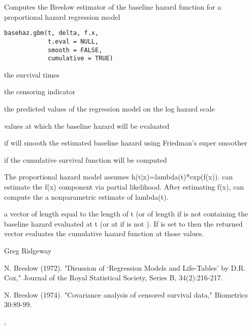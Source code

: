 \begin{Description}\relax
Computes the Breslow estimator of the baseline hazard function for a proportional hazard regression model
\end{Description}
\begin{Usage}
\begin{verbatim}
basehaz.gbm(t, delta, f.x, 
            t.eval = NULL, 
            smooth = FALSE, 
            cumulative = TRUE)
\end{verbatim}
\end{Usage}
\begin{Arguments}
\begin{ldescription}
\item[\code{t}] the survival times 
\item[\code{delta}] the censoring indicator 
\item[\code{f.x}] the predicted values of the regression model on the log hazard scale 
\item[\code{t.eval}] values at which the baseline hazard will be evaluated 
\item[\code{smooth}] if   will smooth the estimated baseline hazard using Friedman's super smoother 
\item[\code{cumulative}] if  the cumulative survival function will be computed 
\end{ldescription}
\end{Arguments}
\begin{Details}\relax
The proportional hazard model assumes h(t|x)=lambda(t)*exp(f(x)).  can estimate the f(x) component via partial likelihood. After estimating f(x),  can compute the a nonparametric estimate of lambda(t).
\end{Details}
\begin{Value}
a vector of length equal to the length of t (or of length  if  is not  containing the baseline hazard evaluated at t (or at  if  is not ). If  is set to  then the returned vector evaluates the cumulative hazard function at those values.
\end{Value}
\begin{Author}\relax
Greg Ridgeway 
\end{Author}
\begin{References}\relax
N. Breslow (1972). "Disussion of `Regression Models and Life-Tables' by D.R. Cox," Journal of the Royal Statistical Society, Series B, 34(2):216-217.

N. Breslow (1974). "Covariance analysis of censored survival data," Biometrics 30:89-99.
\end{References}
\begin{SeeAlso}\relax
{}, 
\end{SeeAlso}

